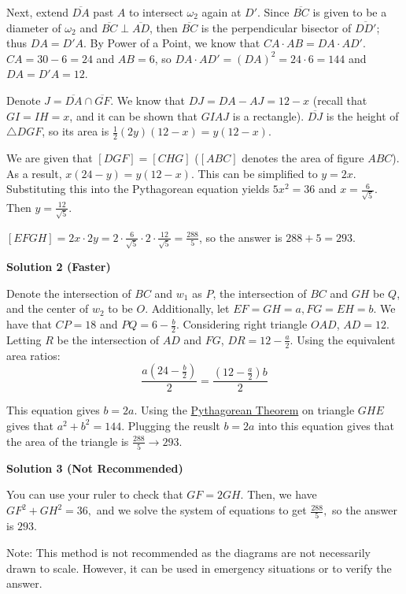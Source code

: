 \begin{enumerate}
 Next, extend $\overline{DA}$ past $A$ to intersect $\omega_2$ again at $D'$. Since $\overline{BC}$ is given to be a diameter of $\omega_2$ and $\overline{BC}\perp\overline{AD}$, then $\overline{BC}$ is the perpendicular bisector of $\overline{DD'}$; thus $DA=D'A$. By Power of a Point, we know that $CA\cdot AB=DA\cdot AD'$. $CA=30-6=24$ and $AB=6$, so $DA\cdot AD'=(DA)^2=24\cdot6=144$ and $DA=D'A=12$.

 Denote $J=\overline{DA}\cap\overline{GF}$. We know that $DJ=DA-AJ=12-x$ (recall that $GI=IH=x$, and it can be shown that $GIAJ$ is a rectangle). $\overline{DJ}$ is the height of $\triangle DGF$, so its area is $\frac{1}{2}(2y)(12-x)=y(12-x)$.

 We are given that $[DGF]=[CHG]$ ($[ABC]$ denotes the area of figure $ABC$). As a result, $x(24-y)=y(12-x)$. This can be simplified to $y=2x$. Substituting this into the Pythagorean equation yields $5x^2=36$ and $x=\frac{6}{\sqrt{5}}$. Then $y=\frac{12}{\sqrt{5}}$.

 $[EFGH]=2x\cdot2y=2\cdot\frac{6}{\sqrt{5}}\cdot2\cdot\frac{12}{\sqrt{5}}=\frac{288}{5}$, so the answer is $288+5=\boxed{293}$. 

 



\textbf{Solution 2 (Faster)}

Denote the intersection of $BC$ and $w_1$ as $P$, the intersection of $BC$ and $GH$ be $Q$, and the center of $w_2$ to be $O$. Additionally, let $EF = GH = a, FG = EH = b$. We have that $CP = 18$ and $PQ = 6-\frac{b}{2}$. Considering right triangle $OAD$, $AD = 12$. Letting $R$ be the intersection of $AD$ and $FG$, $DR = 12 - \frac{a}{2}$. Using the equivalent area ratios: 
 \[\frac{a(24-\frac{b}{2})}{2} = \frac{(12-\frac{a}{2})b}{2}\]

 This equation gives $b=2a$. Using the \href{https://artofproblemsolving.com/wiki/index.php?title=Pythagorean\_Theorem}{Pythagorean Theorem} on triangle $GHE$ gives that $a^2+b^2 = 144$. Plugging the reuslt $b=2a$ into this equation gives that the area of the triangle is $\frac{288}{5} \to \boxed{293}$.

 



\textbf{Solution 3 (Not Recommended)}

You can use your ruler to check that $GF=2GH.$ Then, we have $GF^2+GH^2=36,$ and we solve the system of equations to get $\frac{288}{5},$ so the answer is $\boxed{293}.$

 Note: This method is not recommended as the diagrams are not necessarily drawn to scale. However, it can be used in emergency situations or to verify the answer.


\end{enumerate}
